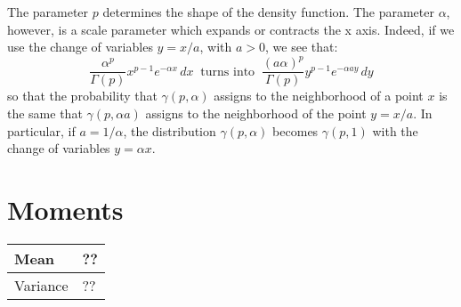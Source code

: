 The parameter $p$ determines the shape of the density function. The parameter $\alpha$, however, is a scale parameter which expands or contracts the x axis. Indeed, if we use the change of variables $y = x/a$, with $a > 0$, we see that:
\[
	\frac{\alpha^p}{\Gamma(p)} x^{p - 1} e^{-\alpha x} \, dx \ \text{ turns into } \
	\frac{(a\alpha)^p}{\Gamma(p)} y^{p - 1} e^{-\alpha a y} \, dy
\]
so that the probability that $\gamma(p, \alpha)$ assigns to the neighborhood of a point $x$ is the same that $\gamma(p, \alpha a)$ assigns to the neighborhood of the point $y = x/a$.
In particular, if $a = 1/\alpha$, the distribution $\gamma(p, \alpha)$ becomes $\gamma(p, 1)$ with the change of variables $y = \alpha x$.

\section{Moments}

\begin{tabularx}{\textwidth}{s X}
	\hline
	Mean & ?? \\\hline
	Variance & ?? \\\hline
\end{tabularx}



